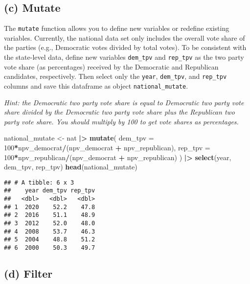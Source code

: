 \documentclass[
]{article}
\newenvironment{Shaded}{\begin{snugshade}}{\end{snugshade}}
\newcommand{\AttributeTok}[1]{\textcolor[rgb]{0.13,0.29,0.53}{#1}}
\newcommand{\DecValTok}[1]{\textcolor[rgb]{0.00,0.00,0.81}{#1}}
\newcommand{\FunctionTok}[1]{\textcolor[rgb]{0.13,0.29,0.53}{\textbf{#1}}}
\newcommand{\NormalTok}[1]{#1}
\newcommand{\OtherTok}[1]{\textcolor[rgb]{0.56,0.35,0.01}{#1}}
\newcommand{\SpecialCharTok}[1]{\textcolor[rgb]{0.81,0.36,0.00}{\textbf{#1}}}
\begin{document}
\subsection{(c) Mutate}\label{c-mutate}

The \texttt{mutate} function allows you to define new variables or
redefine existing variables. Currently, the national data set only
includes the overall vote share of the parties (e.g., Democratic votes
divided by total votes). To be consistent with the state-level data,
define new variables \texttt{dem\_tpv} and \texttt{rep\_tpv} as the two
party vote share (as percentages) received by the Democratic and
Republican candidates, respectively. Then select only the \texttt{year},
\texttt{dem\_tpv}, and \texttt{rep\_tpv} columns and save this dataframe
as object \texttt{national\_mutate}.

\emph{Hint: the Democratic two party vote share is equal to Democratic
two party vote share divided by the Democratic two party vote share plus
the Republican two party vote share. You should multiply by 100 to get
vote shares as percentages.}

\begin{Shaded}
\begin{Highlighting}[]
\NormalTok{national\_mutate }\OtherTok{\textless{}{-}}\NormalTok{ nat }\SpecialCharTok{|\textgreater{}}
  \FunctionTok{mutate}\NormalTok{(}
    \AttributeTok{dem\_tpv =} \DecValTok{100}\SpecialCharTok{*}\NormalTok{npv\_democrat}\SpecialCharTok{/}\NormalTok{(npv\_democrat }\SpecialCharTok{+}\NormalTok{ npv\_republican),}
    \AttributeTok{rep\_tpv =} \DecValTok{100}\SpecialCharTok{*}\NormalTok{npv\_republican}\SpecialCharTok{/}\NormalTok{(npv\_democrat }\SpecialCharTok{+}\NormalTok{ npv\_republican)}
\NormalTok{  ) }\SpecialCharTok{|\textgreater{}}
  \FunctionTok{select}\NormalTok{(year, dem\_tpv, rep\_tpv)}
\FunctionTok{head}\NormalTok{(national\_mutate)}
\end{Highlighting}
\end{Shaded}

\begin{verbatim}
## # A tibble: 6 x 3
##    year dem_tpv rep_tpv
##   <dbl>   <dbl>   <dbl>
## 1  2020    52.2    47.8
## 2  2016    51.1    48.9
## 3  2012    52.0    48.0
## 4  2008    53.7    46.3
## 5  2004    48.8    51.2
## 6  2000    50.3    49.7
\end{verbatim}

\subsection{(d) Filter}\label{d-filter}
\end{document}
